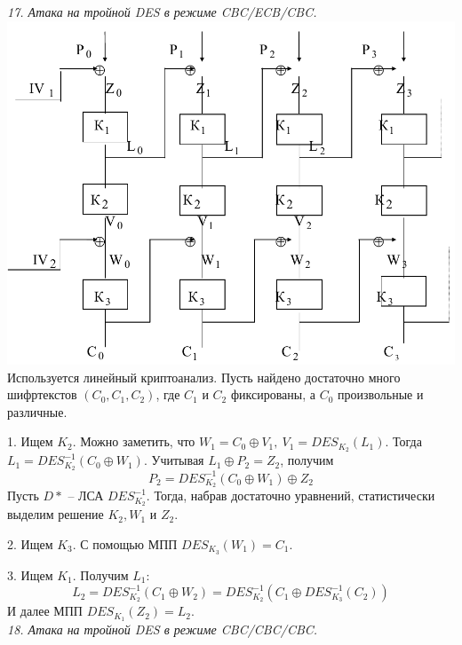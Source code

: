 \noindent \textit{17. Атака на тройной DES в режиме CBC/ECB/CBC.} \\

\includegraphics[scale=.4]{eka/img/CBC_ECB_CBC.png} \\

Используется линейный криптоанализ. Пусть найдено достаточно много шифртекстов $(C_0, C_1, C_2)$, где $C_1$ и $C_2$ фиксированы, а $C_0$ произвольные и различные.

1. Ищем $K_2$. Можно заметить, что $W_1 = C_0 \oplus V_1,\ V_1 = DES_{K_2}(L_1)$. Тогда $L_1 = DES_{K_2}^{-1}(C_0 \oplus W_1)$. Учитывая $L_1 \oplus P_2 = Z_2$, получим
$$P_2 = DES_{K_2}^{-1}(C_0 \oplus W_1) \oplus Z_2$$
Пусть $D*$ -- ЛСА $DES_{K_2}^{-1}$. Тогда, набрав достаточно уравнений, статистически выделим решение $K_2, W_1$ и $Z_2$.

2. Ищем $K_3$. С помощью МПП $DES_{K_3}(W_1) = C_1$.

3. Ищем $K_1$. Получим $L_1$:
$$L_2 = DES_{K_2}^{-1}(C_1 \oplus W_2) = DES_{K_2}^{-1}(C_1 \oplus DES_{K_3}^{-1}(C_2))$$
И далее МПП $DES_{K_1}(Z_2) = L_2$. \\

\newpage
\noindent \textit{18. Атака на тройной DES в режиме CBC/CBC/CBC.} \\

